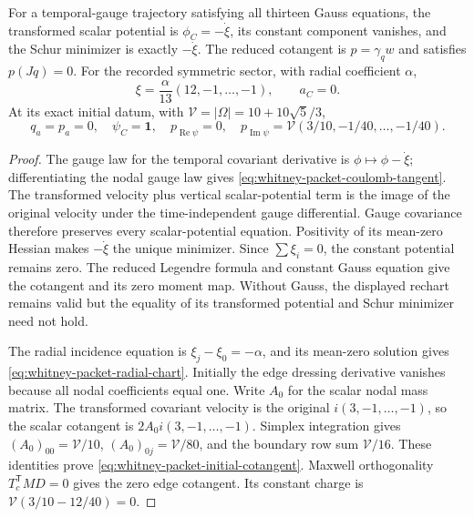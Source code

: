 \begin{proposition}
\label{prop:whitney-packet-coulomb}
For a temporal-gauge trajectory satisfying all thirteen Gauss equations,
the transformed scalar potential is \(\phi_C=-\dot\xi\), its constant
component vanishes, and the Schur minimizer is exactly \(-\dot\xi\).
The reduced cotangent is \(p=\gamma_qw\) and satisfies \(p(Jq)=0\).
For the recorded symmetric sector, with radial coefficient \(\alpha\),
\begin{equation}
 \xi=\frac{\alpha}{13}(12,-1,\ldots,-1),\qquad a_C=0.
 \label{eq:whitney-packet-radial-chart}
\end{equation}
At its exact initial datum, with \(\mathcal V=|\Omega|=10+10\sqrt5/3\),
\begin{equation}
 q_a=p_a=0,\quad \psi_C=\mathbf1,\quad
 p_{\operatorname{Re}\psi}=0,\quad
 p_{\operatorname{Im}\psi}
   =\mathcal V(3/10,-1/40,\ldots,-1/40).
 \label{eq:whitney-packet-initial-cotangent}
\end{equation}
\end{proposition}
\begin{proof}
The gauge law for the temporal covariant derivative is
\(\phi\mapsto\phi-\dot\xi\); differentiating the nodal gauge
law gives \eqref{eq:whitney-packet-coulomb-tangent}. The transformed
velocity plus vertical scalar-potential term is the image of the original
velocity under the time-independent gauge differential. Gauge covariance
therefore preserves every scalar-potential equation. Positivity of its
mean-zero Hessian makes \(-\dot\xi\) the unique minimizer. Since
\(\sum\xi_i=0\), the constant potential remains zero. The reduced
Legendre formula and constant Gauss equation give the cotangent and its
zero moment map. Without Gauss, the displayed rechart remains valid but
the equality of its transformed potential and Schur minimizer need not hold.

The radial incidence equation is \(\xi_j-\xi_0=-\alpha\),
and its mean-zero solution gives \eqref{eq:whitney-packet-radial-chart}.
Initially the edge dressing derivative vanishes because all nodal
coefficients equal one. Write \(A_0\) for the scalar nodal mass matrix.
The transformed covariant velocity is the original
\(i(3,-1,\ldots,-1)\), so the scalar cotangent is
\(2A_0i(3,-1,\ldots,-1)\). Simplex integration gives
\((A_0)_{00}=\mathcal V/10\),
\((A_0)_{0j}=\mathcal V/80\), and the boundary row sum
\(\mathcal V/16\). These identities prove
\eqref{eq:whitney-packet-initial-cotangent}. Maxwell orthogonality
\(T_c^{\mathsf T}MD=0\) gives the zero edge cotangent. Its constant
charge is \(\mathcal V(3/10-12/40)=0\).
\end{proof}

